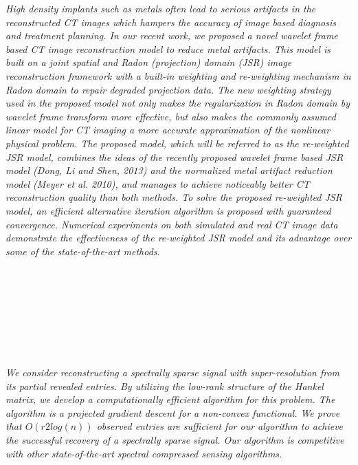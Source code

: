 \begin{multicols}{2}
      \textit{High density implants such as metals often lead to serious artifacts in the reconstructed CT images which hampers the accuracy of image based diagnosis and treatment planning. In our recent work, we proposed a novel wavelet frame based CT image reconstruction model to reduce metal artifacts. This model is built on a joint spatial and Radon (projection) domain (JSR) image reconstruction framework with a built-in weighting and re-weighting mechanism in Radon domain to repair degraded projection data. The new weighting strategy used in the proposed model not only makes the regularization in Radon domain by wavelet frame transform more effective, but also makes the commonly assumed linear model for CT imaging a more accurate approximation of the nonlinear physical problem. The proposed model, which will be referred to as the re-weighted JSR model, combines the ideas of the recently proposed wavelet frame based JSR model (Dong, Li and Shen, 2013) and the normalized metal artifact reduction model (Meyer et al. 2010), and manages to achieve noticeably better CT reconstruction quality than both methods. To solve the proposed re-weighted JSR model, an efficient alternative iteration algorithm is proposed with guaranteed convergence. Numerical experiments on both simulated and real CT image data demonstrate the effectiveness of the re-weighted JSR model and its advantage over some of the state-of-the-art methods.}\\
\\ 
        \\
        \\\\
        \\
        \\\\
\\
      \textit{We consider reconstructing a spectrally sparse signal with super-resolution from its partial revealed entries. By utilizing the low-rank structure of the Hankel matrix, we develop a computationally efficient algorithm for this problem. The algorithm is a projected gradient descent for a non-convex functional. We prove that $O(r2log(n))$ observed entries are sufficient for our algorithm to achieve the successful recovery of a spectrally sparse signal. Our algorithm is competitive with other state-of-the-art spectral compressed sensing algorithms.}\\
\\ 

\end{multicols}
